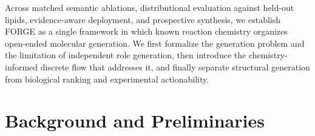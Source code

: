 \documentclass{article}
\begin{document}
Across matched semantic ablations, distributional evaluation against held-out lipids, evidence-aware
deployment, and prospective synthesis, we establish FORGE as a single framework in which known
reaction chemistry organizes open-ended molecular generation. We first formalize the generation
problem and the limitation of independent role generation, then introduce the chemistry-informed
discrete flow that addresses it, and finally separate structural generation from biological ranking
and experimental actionability.

\section{Background and Preliminaries}
\label{sec:background}
\end{document}
